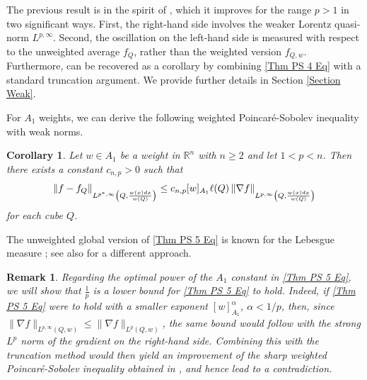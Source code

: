 \documentclass[reqno, 10pt, oneside]{amsart}
\numberwithin{equation}{section}
\newcommand{\strt}[1]{\rule{0pt}{#1}}
\newtheorem{corollary}[theorem]{Corollary}
\newtheorem{remark}[theorem]{Remark}
\numberwithin{theorem}{section}
\newcommand{\R}{{\mathbb R}}
\newcommand{\1}{{\rm 1\hspace*{-0.4ex}%
\rule{0.1ex}{1.52ex}\hspace*{0.2ex}}}
\begin{document}
The previous result is in the spirit of \cite[Theorem 1.21]{PR}, which it improves for the range $p > 1$ in two significant ways. First, the right-hand side involves the weaker Lorentz quasi-norm $L^{p,\infty}$. Second, the oscillation on the left-hand side is measured with respect to the unweighted average $f_Q$, rather than the weighted version $f_{Q,w}$. Furthermore, \cite[Theorem 1.21]{PR} can be recovered as a corollary by combining \eqref{Thm PS 4 Eq} with a standard truncation argument. We provide further details in Section \ref{Section Weak}.


For $A_1$ weights, we can derive the following weighted Poincaré-Sobolev inequality with weak norms.

\begin{corollary}\label{Thm PS 5}
    Let $w\in A_1$ be a weight in $\R^n$ with $n\ge 2$ and let $1<p<n$. Then there exists a constant $c_{n,p}>0$ such that
        \begin{equation}\label{Thm PS 5 Eq}
            \left\| f-f_Q\right\|_{\strt{2.3ex} L^{p^*,\infty}\left(Q,\frac{w(x)dx}{w(Q)}\right)}
            \le c_{n,p} [w]_{A_1} \ell(Q)
            \left\| \nabla f \right\|_{\strt{2.3ex} L^{p,\infty}\left(Q,\frac{w(x)dx}{w(Q)}\right)}
        \end{equation}
    for each cube $Q$.
\end{corollary}

The unweighted global version of \eqref{Thm PS 5 Eq} is known for the Lebesgue measure \cite{Peetre}; see also \cite{Maly} for a different approach.

\begin{remark}
Regarding the optimal power of the $A_1$ constant in \eqref{Thm PS 5 Eq}, we will show that $\frac{1}{p}$ is a lower bound for \eqref{Thm PS 5 Eq} to hold. Indeed, if \eqref{Thm PS 5 Eq} were to hold with a smaller exponent $[w]_{A_1}^{\alpha}$, $\alpha<1/p$, then, since $\|\nabla f\|_{L^{p,\infty}\left(Q,w\right)} \le \|\nabla f\|_{L^{p}\left(Q,w\right)}$, the same bound would follow with the strong $L^p$ norm of the gradient on the right-hand side. Combining this with the truncation method would then yield an improvement of the sharp weighted Poincaré-Sobolev inequality obtained in \cite[Theorem 2.4]{ClarosJFA}, and hence lead to a contradiction.
\end{remark}
\end{document}
